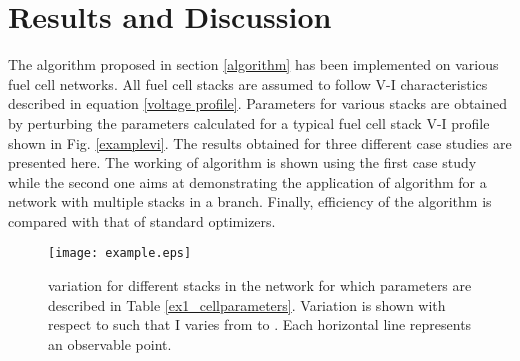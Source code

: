 \documentclass[twocolumn]{autart}
\begin{document}
\section{Results and Discussion}
The algorithm proposed in section \ref{algorithm} has been implemented on various fuel cell networks. All fuel cell stacks are assumed to follow V-I characteristics described in equation \eqref{voltage profile}. Parameters for various stacks are obtained by perturbing the parameters calculated for a typical fuel cell stack V-I profile shown in Fig. \ref{examplevi}. The results obtained for three different case studies are presented here. The working of algorithm is shown using the first case study while the second one aims at demonstrating the application of algorithm for a network with multiple stacks in a branch. Finally, efficiency of the algorithm is compared with that of standard optimizers. 
\begin{figure*}[htbp]
\centering
\texttt{[image: example.eps]}
\caption{ variation for different stacks in the network for which parameters are described in Table \ref{ex1_cellparameters}. Variation is shown with respect to  such that I varies from  to . Each horizontal line represents an observable point.}
\label{ex1_dpdicurve}
\end{figure*}
\end{document}
